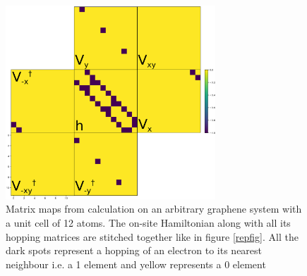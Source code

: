 \begin{figure}[H]
	\centering
	\includegraphics[width=0.7\textwidth]{Figures/stitch.eps}
	\caption{Matrix maps from calculation on an arbitrary graphene system with a unit cell of 12 atoms. The on-site Hamiltonian along with all its hopping matrices are stitched together like in figure \cref{repfig}. All the dark spots represent a hopping of an electron to its nearest neighbour i.e. a 1 element and yellow represents a 0 element}
	\label{matrixmap}
\end{figure}
